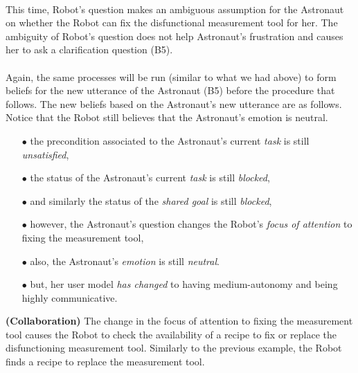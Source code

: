 \noindent{}\\

This time, Robot's question makes an ambiguous assumption for the Astronaut on
whether the Robot can fix the disfunctional measurement tool for her. The
ambiguity of Robot's question does not help Astronaut's frustration and causes
her to ask a clarification question (B5).\\

\noindent{}\\

Again, the same processes will be run (similar to what we had above) to form
beliefs for the new utterance of the Astronaut (B5) before the procedure that
follows. The new beliefs based on the Astronaut's new utterance are as follows.
Notice that the Robot still believes that the Astronaut's emotion is neutral.

\begin{itemize}
  \item[$\bullet$] the precondition associated to the Astronaut's current
  \textit{task} is still \textit{unsatisfied},
  \item[$\bullet$] the status of the Astronaut's current \textit{task} is still
  \textit{blocked},
  \item[$\bullet$] and similarly the status of the \textit{shared goal} is
  still \textit{blocked},
  \item[$\bullet$] however, the Astronaut's question changes the Robot's
  \textit{focus of attention} to fixing the measurement tool,
  \item[$\bullet$] also, the Astronaut's \textit{emotion} is still
  \textit{neutral}.
  \item[$\bullet$] but, her user model \textit{has changed} to having
  medium-autonomy and being highly communicative.
\end{itemize}

\noindent\textbf{(Collaboration)} The change in the focus of attention to fixing
the measurement tool causes the Robot to check the availability of a recipe to
fix or replace the disfunctioning measurement tool. Similarly to the previous
example, the Robot finds a recipe to replace the measurement tool.\\


